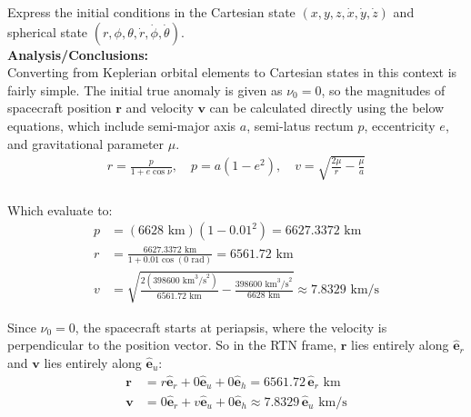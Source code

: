 \documentclass[titlepage]{article}
\begin{document}
Express the initial conditions in the Cartesian state $(x,y,z,\dot{x},\dot{y},\dot{z})$ and spherical state $(r,\phi,\theta,\dot{r},\dot{\phi},\dot{\theta})$.\\

\textbf{Analysis/Conclusions:}\\

Converting from Keplerian orbital elements to Cartesian states in this context is fairly simple. The initial true anomaly is given as $\nu_0=0$, so the magnitudes of spacecraft position $\boldsymbol{r}$ and velocity $\boldsymbol{v}$ can be calculated directly using the below equations, which include semi-major axis $a$, semi-latus rectum $p$, eccentricity $e$, and gravitational parameter $\mu$.
\begin{equation}
	\begin{split}
		r=\frac{p}{1+e\cos{\nu}},\quad p=a(1-e^2),\quad v=\sqrt{\frac{2\mu}{r}-\frac{\mu}{a}} \\
	\end{split}
\end{equation}

Which evaluate to:
\begin{equation}
	\begin{split}
		p&=(6628\text{ km})(1-0.01^2)=6627.3372\text{ km} \\
		r&=\frac{6627.3372\text{ km}}{1+0.01\cos(0\text{ rad})}=6561.72\text{ km} \\
		v&=\sqrt{\frac{2(398600\text{ km}^3\text{/s}^2)}{6561.72\text{ km}}-\frac{398600\text{ km}^3\text{/s}^2}{6628\text{ km}}}\approx7.8329\text{ km/s}
	\end{split}
\end{equation}

Since $\nu_0=0$, the spacecraft starts at periapsis, where the velocity is perpendicular to the position vector. So in the RTN frame, $\boldsymbol{r}$ lies entirely along $\hat{\boldsymbol{e}}_r$ and $\boldsymbol{v}$ lies entirely along $\hat{\boldsymbol{e}}_u$:
\begin{equation}
	\begin{split}
		\boldsymbol{r}&=r\hat{\boldsymbol{e}}_r+0\hat{\boldsymbol{e}}_u+0\hat{\boldsymbol{e}}_h=6561.72\,\hat{\boldsymbol{e}}_r\text{ km} \\
		\boldsymbol{v}&=0\hat{\boldsymbol{e}}_r+v\hat{\boldsymbol{e}}_u+0\hat{\boldsymbol{e}}_h\approx7.8329\,\hat{\boldsymbol{e}}_u\text{ km/s}
	\end{split}
	\label{eq:rtnrv}
\end{equation}
\end{document}
